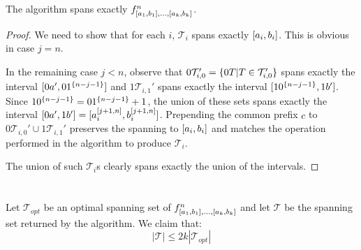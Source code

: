 
\section{\titlefeasibility}
\begin{theorem}
The algorithm spans exactly
$f^n_{[a_1, b_1], \ldots, [a_k, b_k]}$.
\end{theorem}

\begin{proof}
We need to show that for each $i$,
$\mathcal{T}_i$ spans exactly $[a_i, b_i]$.
This is obvious in case $j = n$.

In the remaining case $j < n$,
observe that
$0 \mathcal{T}_{i, 0}'
= \{0 T | T \in \mathcal{T}_{i, 0}'\}$
spans exactly the interval
$[0 a', 0 1^{\{n-j-1\}}]$
and $1 \mathcal{T}_{i, 1}'$
spans exactly the interval
$[1 0^{\{n-j-1\}}, 1 b']$.
Since $1 0^{\{n-j-1\}} = 0 1^{\{n-j-1\}} + 1$,
the union of these sets
spans exactly the interval
$[0 a', 1 b']
= [a_i^{[j+1, n]}, b_i^{[j+1, n]}]$.
Prepending the common prefix $c$ to
$0 \mathcal{T}_{i, 0}' \cup 1 \mathcal{T}_{i, 1}'$
preserves the spanning to
$[a_i, b_i]$
and matches the operation performed in the algorithm
to produce $\mathcal{T}_i$.

The union of such $\mathcal{T}_i$s clearly spans exactly
the union of the intervals.
\end{proof}

\section{\titleapproxratio}


\begin{theorem}
\label{theorem:2kapproxratio}
\label{theorem:spd2kapprox}
Let $\mathcal{T}_{opt}$ be an optimal spanning set of
$f^n_{[a_1, b_1], \ldots, [a_k, b_k]}$
and let $\mathcal{T}$ be the spanning set returned
by the algorithm.
We claim that:
\begin{equation*}
|\mathcal{T}| \leq 2k |\mathcal{T}_{opt}|
\end{equation*}
\end{theorem}

